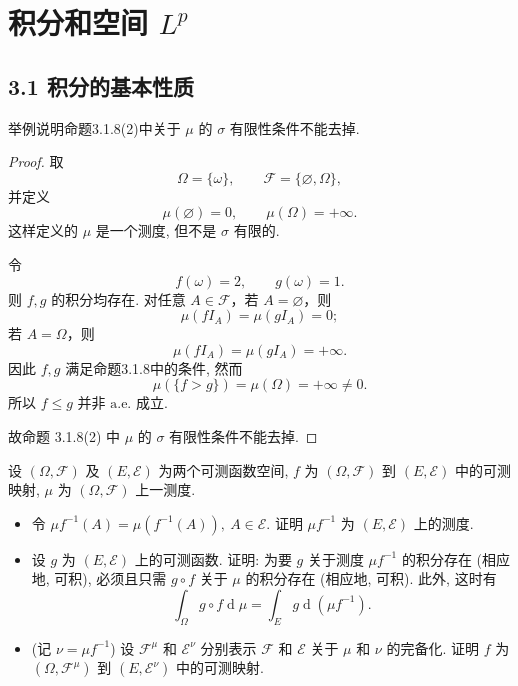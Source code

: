 \section{积分和空间 $L^p$}
    \subsection{3.1 积分的基本性质}
        \begin{1}
            举例说明命题3.1.8(2)中关于 $\mu$ 的 $\sigma$ 有限性条件不能去掉.
        \end{1}
        \begin{proof}
            取
            \[
                \Omega=\{\omega\},\qquad
                \mathcal{F}=\{\varnothing,\Omega\},
            \]
            并定义
            \[
                \mu(\varnothing)=0,\qquad \mu(\Omega)=+\infty.
            \]
            这样定义的 $\mu$ 是一个测度, 但不是 $\sigma$ 有限的. 

            令
            \[
                f(\omega)=2,\qquad g(\omega)=1.
            \]
            则 $f,g$ 的积分均存在. 对任意 $A\in\mathcal{F}$，若 $A=\varnothing$，则
            \[
                \mu(fI_A)=\mu(gI_A)=0;
            \]
            若 $A=\Omega$，则
            \[
                \mu(fI_A)=\mu(gI_A)=+\infty.
            \]
            因此 $f,g$ 满足命题3.1.8中的条件, 
            然而
            \[
                \mu(\{f>g\})=\mu(\Omega)=+\infty\neq0.
            \]
            所以 $f\leqslant g$ 并非 $\mathrm{a.e.}$ 成立.

            故命题 3.1.8(2) 中 $\mu$ 的 $\sigma$ 有限性条件不能去掉.
        \end{proof}
        \begin{6}
            设 $(\Omega,\mathcal{F})$ 及 $(E,\mathcal{E})$ 为两个可测函数空间, 
            $f$ 为 $(\Omega,\mathcal{F})$ 到 $(E,\mathcal{E})$ 中的可测映射, 
            $\mu$ 为 $(\Omega,\mathcal{F})$ 上一测度.
            \begin{itemize}
                \item[(1)] 令 $\mu f^{-1}(A)=\mu(f^{-1}(A)),\ A\in\mathcal{E}$. 
                证明 $\mu f^{-1}$ 为 $(E,\mathcal{E})$ 上的测度.

                \item[(2)] 设 $g$ 为 $(E,\mathcal{E})$ 上的可测函数. 证明: 为要 $g$ 关于测度 $\mu f^{-1}$ 的积分存在 (相应地, 可积), 
                必须且只需 $g\circ f$ 关于 $\mu$ 的积分存在 (相应地, 可积). 
                此外, 这时有
                \[
                    \int_\Omega g\circ f \operatorname{d}\!\mu=\int_E g\operatorname{d}(\mu f^{-1}).\tag{1}
                \]

                \item[(3)] (记 $\nu=\mu f^{-1}$) 设 $\mathcal{F}^\mu$ 和 $\mathcal{E}^\nu$ 分别表示 $\mathcal{F}$ 和 $\mathcal{E}$ 关于 $\mu$ 和 $\nu$ 的完备化. 
                证明 $f$ 为 $(\Omega,\mathcal{F}^\mu)$ 到 $(E,\mathcal{E}^\nu)$ 中的可测映射.
            \end{itemize}
        \end{6}
